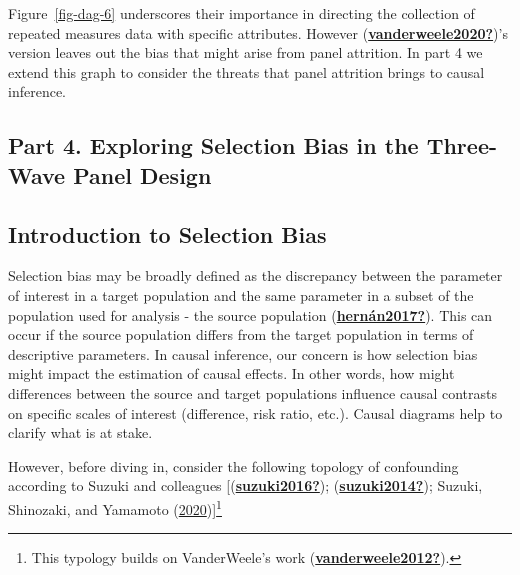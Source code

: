 \documentclass[
  singlecolumn]{report}
\begin{document}
Figure~\ref{fig-dag-6} underscores their importance in directing the
collection of repeated measures data with specific attributes. However
(\protect\hyperlink{ref-vanderweele2020}{\textbf{vanderweele2020?}})'s
version leaves out the bias that might arise from panel attrition. In
part 4 we extend this graph to consider the threats that panel attrition
brings to causal inference.

\hypertarget{part-4.-exploring-selection-bias-in-the-three-wave-panel-design}{%
\subsection{Part 4. Exploring Selection Bias in the Three-Wave Panel
Design}\label{part-4.-exploring-selection-bias-in-the-three-wave-panel-design}}

\hypertarget{introduction-to-selection-bias}{%
\subsection{Introduction to Selection
Bias}\label{introduction-to-selection-bias}}

Selection bias may be broadly defined as the discrepancy between the
parameter of interest in a target population and the same parameter in a
subset of the population used for analysis - the source population
(\protect\hyperlink{ref-hernuxe1n2017}{\textbf{hernán2017?}}). This can
occur if the source population differs from the target population in
terms of descriptive parameters. In causal inference, our concern is how
selection bias might impact the estimation of causal effects. In other
words, how might differences between the source and target populations
influence causal contrasts on specific scales of interest (difference,
risk ratio, etc.). Causal diagrams help to clarify what is at stake.

However, before diving in, consider the following topology of
confounding according to Suzuki and colleagues
{[}(\protect\hyperlink{ref-suzuki2016}{\textbf{suzuki2016?}});
(\protect\hyperlink{ref-suzuki2014}{\textbf{suzuki2014?}}); Suzuki,
Shinozaki, and Yamamoto
(\protect\hyperlink{ref-suzuki2020}{2020}){]}\footnote{This typology
  builds on VanderWeele's work
  (\protect\hyperlink{ref-vanderweele2012}{\textbf{vanderweele2012?}}).}
\end{document}
